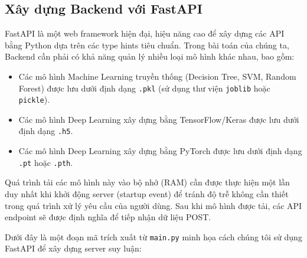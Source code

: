 \subsection{Xây dựng Backend với FastAPI}
FastAPI là một web framework hiện đại, hiệu năng cao để xây dựng các API bằng Python dựa trên các type hints tiêu chuẩn. Trong bài toán của chúng ta, Backend cần phải có khả năng quản lý nhiều loại mô hình khác nhau, bao gồm:
\begin{itemize}
    \item Các mô hình Machine Learning truyền thống (Decision Tree, SVM, Random Forest) được lưu dưới định dạng \texttt{.pkl} (sử dụng thư viện \texttt{joblib} hoặc \texttt{pickle}).
    \item Các mô hình Deep Learning xây dựng bằng TensorFlow/Keras được lưu dưới định dạng \texttt{.h5}.
    \item Các mô hình Deep Learning xây dựng bằng PyTorch được lưu dưới định dạng \texttt{.pt} hoặc \texttt{.pth}.
\end{itemize}

Quá trình tải các mô hình này vào bộ nhớ (RAM) cần được thực hiện một lần duy nhất khi khởi động server (startup event) để tránh độ trễ không cần thiết trong quá trình xử lý yêu cầu của người dùng. Sau khi mô hình được tải, các API endpoint sẽ được định nghĩa để tiếp nhận dữ liệu POST.

Dưới đây là một đoạn mã trích xuất từ \texttt{main.py} minh họa cách chúng tôi sử dụng FastAPI để xây dựng server suy luận:

